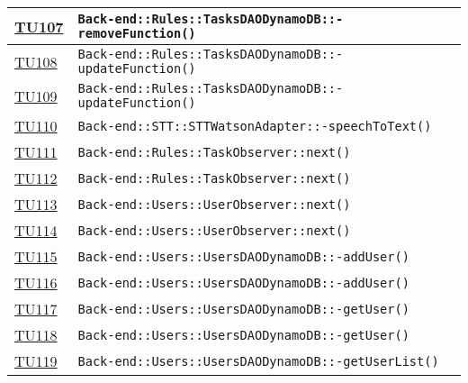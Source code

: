 \begin{longtable}{|>{\centering}m{1cm}|m{12cm}<{\centering}|}
\hyperlink{TU107}{TU107} & \texttt{Back-end::Rules::TasksDAODynamoDB::-\linebreak removeFunction()}\\ \hline

\hyperlink{TU108}{TU108} & \texttt{Back-end::Rules::TasksDAODynamoDB::-\linebreak updateFunction()}\\ \hline

\hyperlink{TU109}{TU109} & \texttt{Back-end::Rules::TasksDAODynamoDB::-\linebreak updateFunction()}\\ \hline

\hyperlink{TU110}{TU110} & \texttt{Back-end::STT::STTWatsonAdapter::-\linebreak speechToText()}\\ \hline

\hyperlink{TU111}{TU111} & \texttt{Back-end::Rules::TaskObserver::next()}\\ \hline

\hyperlink{TU112}{TU112} & \texttt{Back-end::Rules::TaskObserver::next()}\\ \hline

\hyperlink{TU113}{TU113} & \texttt{Back-end::Users::UserObserver::next()}\\ \hline

\hyperlink{TU114}{TU114} & \texttt{Back-end::Users::UserObserver::next()}\\ \hline

\hyperlink{TU115}{TU115} & \texttt{Back-end::Users::UsersDAODynamoDB::-\linebreak addUser()}\\ \hline

\hyperlink{TU116}{TU116} & \texttt{Back-end::Users::UsersDAODynamoDB::-\linebreak addUser()}\\ \hline

\hyperlink{TU117}{TU117} & \texttt{Back-end::Users::UsersDAODynamoDB::-\linebreak getUser()}\\ \hline

\hyperlink{TU118}{TU118} & \texttt{Back-end::Users::UsersDAODynamoDB::-\linebreak getUser()}\\ \hline

\hyperlink{TU119}{TU119} & \texttt{Back-end::Users::UsersDAODynamoDB::-\linebreak getUserList()}\\ \hline


\end{longtable}
